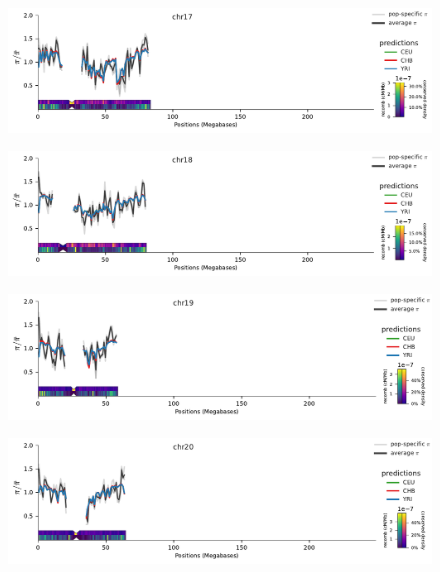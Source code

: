 \documentclass[11pt]{article}
\begin{document}
\begin{figure}[!htb]
  \centering
  \includegraphics[width=\textwidth]{figures/supplementary/pred_plot_chr17.pdf}
  \label{suppfig:fit-chr17}
\end{figure}


\begin{figure}[!htb]
  \centering
  \includegraphics[width=\textwidth]{figures/supplementary/pred_plot_chr18.pdf}
  \label{suppfig:fit-chr18}
\end{figure}


\begin{figure}[!htb]
  \centering
  \includegraphics[width=\textwidth]{figures/supplementary/pred_plot_chr19.pdf}
  \label{suppfig:fit-chr19}
\end{figure}


\begin{figure}[!htb]
  \centering
  \includegraphics[width=\textwidth]{figures/supplementary/pred_plot_chr20.pdf}
  \label{suppfig:fit-chr20}
\end{figure}
\end{document}
